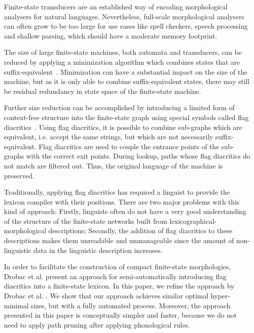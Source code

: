 \documentclass[11pt]{article}
\begin{document}
Finite-state transducers are an established way of encoding
morphological analysers for natural languages. Nevertheless,
full-scale morphological analysers can often grow to be too large for
use cases like spell checkers, speech processing and shallow parsing,
which should have a moderate memory footprint.

The size of large finite-state machines, both automata and
transducers, can be reduced by applying a minimization algorithm which
combines states that are
suffix-equivalent~\cite{Aho1986}. Minimization can have a substantial
impact on the size of the machine, but as it is only able to combine
suffix-equivalent states, there may still be residual redundancy in
state space of the finite-state machine.

Further size reduction can be accomplished by introducing a limited
form of context-free structure into the finite-state graph using
special symbols called flag
diacritics~\cite{beesley1998constraining}. Using flag diacritics, it
is possible to combine sub-graphs which are equivalent, i.e. accept
the same strings, but which are not necessarily
suffix-equivalent. Flag diacritics are used to couple the entrance
points of the sub-graphs with the correct exit points. During lookup,
paths whose flag diacritics do not match are filtered out. Thus, the
original language of the machine is preserved.

Traditionally, applying flag diacritics has required a linguist to
provide the lexicon compiler with their positions. There are two major
problems with this kind of approach: Firstly, linguists often do not
have a very good understanding of the structure of the finite-state
networks built from lexicographical-morphological descriptions;
Secondly, the addition of flag diacritics to these descriptions makes
them unreadable and unmanageable since the amount of non-linguistic
data in the linguistic description increases.

In order to facilitate the construction of compact finite-state
morphologies, Drobac et al.  present an approach
for semi-automatically introducing flag diacritics into a finite-state
lexicon. In this paper, we refine the approach by Drobac et
al. . We show that our approach achieves similar optimal hyper-minimal sizes, 
but with a fully automated process. Moreover, the approach presented in this
paper is conceptually simpler and faster, because we do not need to apply path
pruning after applying phonological rules.
\end{document}
